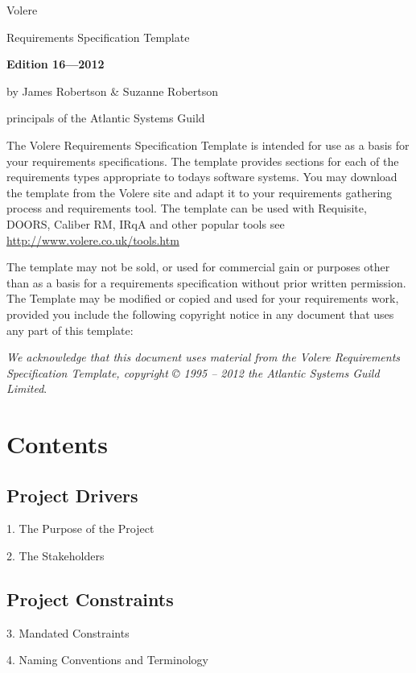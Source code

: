 \documentclass[
]{article}
\author{}
\date{}
\begin{document}
Volere

Requirements Specification Template

\textbf{Edition 16---2012}

by James Robertson \& Suzanne Robertson

principals of the Atlantic Systems Guild

The Volere Requirements Specification Template is intended for use as a
basis for your requirements specifications. The template provides
sections for each of the requirements types appropriate to
today\textquotesingle s software systems. You may download the template
from the Volere site and adapt it to your requirements gathering process
and requirements tool. The template can be used with Requisite, DOORS,
Caliber RM, IRqA and other popular tools see
\url{http://www.volere.co.uk/tools.htm}

The template may not be sold, or used for commercial gain or purposes
other than as a basis for a requirements specification without prior
written permission. The Template may be modified or copied and used for
your requirements work, provided you include the following copyright
notice in any document that uses any part of this template:

\emph{We acknowledge that this document uses material from the Volere
Requirements Specification Template, copyright © 1995 -- 2012 the
Atlantic Systems Guild Limited}.

\hypertarget{contents}{%
\section{Contents}\label{contents}}

\hypertarget{project-drivers}{%
\subsection{Project Drivers}\label{project-drivers}}

1. The Purpose of the Project

2. The Stakeholders

\hypertarget{project-constraints}{%
\subsection{Project Constraints}\label{project-constraints}}

3. Mandated Constraints

4. Naming Conventions and Terminology
\end{document}
